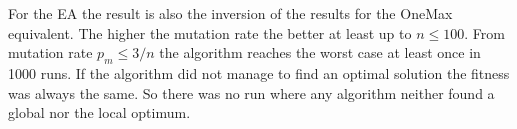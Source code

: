 For the EA the result is also the inversion of the results for the OneMax equivalent.
The higher the mutation rate the better at least up to $n\le100$.
From mutation rate $p_m\le3/n$ the algorithm reaches the worst case at least once in 1000 runs.
If the algorithm did not manage to find an optimal solution the fitness was always the same.
So there was no run where any algorithm neither found a global nor the local optimum.